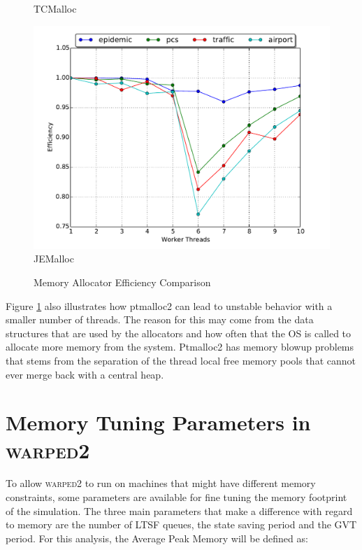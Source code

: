 \documentclass[11pt]{book}
\begin{document}
\begin{figure}
\begin{minipage}{.5\textwidth}
\begin{center}
      TCMalloc \\
    \end{center}
  \end{minipage}
  \centering
  \begin{minipage}{.5\textwidth}
    \begin{center}
      \includegraphics[width=\textwidth,keepaspectratio,quiet]{figs/memory_allocation/jemalloc_efficiency.pdf} \\
      JEMalloc \\
    \end{center}
  \end{minipage}
  \caption{Memory Allocator Efficiency Comparison}\label{allocator_analysis_efficiency}
\end{figure}

Figure \ref{allocator_analysis_efficiency} also illustrates how ptmalloc2 can lead to unstable
behavior with a smaller number of threads. The reason for this may come from the data structures
that are used by the allocators and how often that the OS is called to allocate more memory
from the system. Ptmalloc2 has memory blowup problems that stems from the separation of the thread
local free memory pools that cannot ever merge back with a central heap.

\section{Memory Tuning Parameters in \textsc{warped2}}

To allow \textsc{warped2} to run on machines that might have different memory constraints,
some parameters are available for fine tuning the memory footprint of the simulation. The
three main parameters that make a difference with regard to memory are the number of LTSF queues,
the state saving period and the GVT period. For this analysis, the Average Peak Memory will be
defined as:
\end{document}

